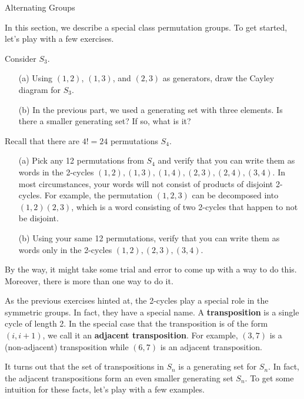 \begin{section}{Alternating Groups}

In this section, we describe a special class permutation groups.  To get started, let's play with a few exercises.

\begin{exercise}
Consider \(S_3\).
\begin{enumerate}
\item[(a)] Using \((1,2)\), \((1,3)\), and \((2,3)\) as generators, draw the Cayley diagram for \(S_3\).
\item[(b)] In the previous part, we used a generating set with three elements.  Is there a smaller generating set?  If so, what is it?
\end{enumerate}
\end{exercise}

\begin{exercise}
Recall that there are \(4!=24\) permutations \(S_4\).    
\begin{enumerate}
\item[(a)] Pick any 12 permutations from \(S_4\) and verify that you can write them as words in the 2-cycles \((1,2), (1,3), (1,4), (2,3), (2,4),(3,4)\).  In most circumstances, your words will not consist of products of disjoint 2-cycles.  For example, the permutation \((1,2,3)\) can be decomposed into \((1,2)(2,3)\), which is a word consisting of two 2-cycles that happen to not be disjoint.
\item[(b)] Using your same 12 permutations, verify that you can write them as words only in the 2-cycles \((1,2),(2,3),(3,4)\).
\end{enumerate}
By the way, it might take some trial and error to come up with a way to do this.  Moreover, there is more than one way to do it.
\end{exercise}

As the previous exercises hinted at, the 2-cycles play a special role in the symmetric groups.  In fact, they have a special name.  A \textbf{transposition} is a single cycle of length 2.  In the special case that the transposition is of the form \((i,i+1)\), we call it an \textbf{adjacent transposition}.  For example, \((3,7)\) is a (non-adjacent) transposition while \((6,7)\) is an adjacent transposition.

It turns out that the set of transpositions in \(S_n\) is a generating set for \(S_n\).  In fact, the adjacent transpositions form an even smaller generating set \(S_n\).  To get some intuition for these facts, let's play with a few examples.


\end{section}
